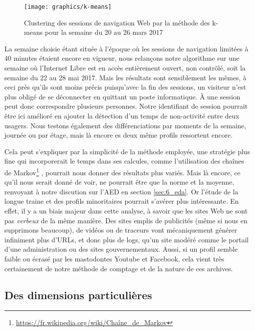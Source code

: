 \documentclass[symmetric,justified,marginals=raggedouter]{tufte-book}
\begin{document}
\begin{figure*}
  \texttt{[image: graphics/k-means]}
  \caption{Clustering des sessions de navigation Web par la méthode des k-means pour la semaine du 20 au 26 mars 2017}
  \label{fig:k-means}
\end{figure*}

\noindent La semaine choisie étant située à l'époque où les sessions de navigation limitées à 40 minutes étaient encore en vigueur, nous relançons notre algorithme sur une semaine où l'Internet Libre est en accès entièrement ouvert, non contrôlé, soit la semaine du 22 au 28 mai 2017. Mais les résultats sont sensiblement les mêmes, à ceci près qu'ils sont moins précis puisqu'avec la fin des sessions, un visiteur n'est plus obligé de se déconnecter en quittant un poste informatique. À une session peut donc correspondre plusieurs personnes. Notre identifiant de session pourrait être ici amélioré en ajouter la détection d'un temps de non-activité entre deux usagers. Nous testons également des différenciations par moments de la semaine, journée ou par étage, mais là encore es deux même profils ressortent encore.

Cela peut s'expliquer par la simplicité de la méthode employée, une stratégie plus fine qui incorporerait le temps dans ses calcules, comme l'utilisation des chaînes de Markov\footnote{\url{https://fr.wikipedia.org/wiki/Chaîne\_de\_Markov}} \citep{cadez_model-based_2003}, pourrait nous donner des résultats plus variés. Mais là encore, ce qu'il nous serait donné de voir, ne pourrait être que la norme et la moyenne, renvoyant à notre discution sur l'AED en section \ref{sec:6_eda}. Or l'étude de la longue traine et des profils minoritaires pourrait s'avérer plus intéressante. En effet, il y a un biais majeur dans cette analyse, à savoir que les sites Web ne sont pas \textit{verbeux} de la même manière. Des sites emplis de publicités (même si nous en supprimons beaucoup), de vidéos ou de traceurs vont mécaniquement générer infiniment plus d'URLs, et donc plus de logs, qu'un site modéré comme le portail d'une administration ou des sites gouvernementaux. Aussi, si un profil semble faible ou écrasé par les mastodontes Youtube et Facebook, cela vient très certainement de notre méthode de comptage et de la nature de ces archives.

\subsection{Des dimensions particulières}
\end{document}
